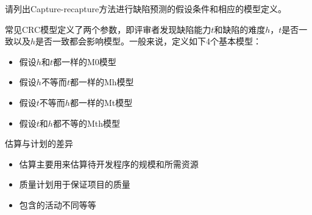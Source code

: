 \begin{problem}
    请列出Capture-recapture方法进行缺陷预测的假设条件和相应的模型定义。

    常见CRC模型定义了两个参数，即评审者发现缺陷能力$t$和缺陷的难度$h$，$t$是否一致以及$h$是否一致都会影响模型。一般来说，定义如下4个基本模型：
    \vspace{-0.8em}
    \begin{multicols}{2}
        \begin{itemize}
            \item 假设$h$和$t$都一样的M0模型
            \item 假设$h$不等而$t$都一样的Mh模型
            \item 假设$t$不等而$h$都一样的Mt模型
            \item 假设$t$和$h$都不等的Mth模型
        \end{itemize}
    \end{multicols}
    \vspace{-1em}
\end{problem}

\begin{problem}
估算与计划的差异

\vspace{-0.8em}
\begin{multicols}{2}
    \begin{itemize}
        \item 估算主要用来估算待开发程序的规模和所需资源
        \item 质量计划用于保证项目的质量
        \item 包含的活动不同等等
    \end{itemize}
\end{multicols}
\vspace{-1em}
\end{problem}